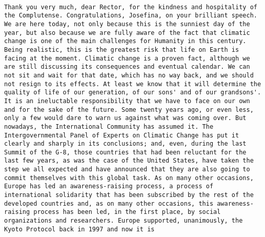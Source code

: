 \documentclass[
]{article}
\begin{document}
\begin{verbatim}
                                                                                                                                                                                                                                                                                                                                                                                                                                                                                                                                                                                                                                                                                                                                                                                                                                                                                                                                                                                                                                                                                                                                                                                                                                                                                                                                                                                                                                                                                                                                                                                           Thank you very much, dear Rector, for the kindness and hospitality of the Complutense. Congratulations, Josefina, on your brilliant speech. We are here today, not only because this is the sunniest day of the year, but also because we are fully aware of the fact that climatic change is one of the main challenges for Humanity in this century. Being realistic, this is the greatest risk that life on Earth is facing at the moment. Climatic change is a proven fact, although we are still discussing its consequences and eventual calendar. We can not sit and wait for that date, which has no way back, and we should not resign to its effects. At least we know that it will determine the quality of life of our generation, of our sons' and of our grandsons'. It is an ineluctable responsibility that we have to face on our own and for the sake of the future. Some twenty years ago, or even less, only a few would dare to warn us against what was coming over. But nowadays, the International Community has assumed it. The Intergovernmental Panel of Experts on Climatic Change has put it clearly and sharply in its conclusions; and, even, during the last Summit of the G-8, those countries that had been reluctant for the last few years, as was the case of the United States, have taken the step we all expected and have announced that they are also going to commit themselves with this global task. As on many other occasions, Europe has led an awareness-raising process, a process of international solidarity that has been subscribed by the rest of the developed countries and, as on many other occasions, this awareness-raising process has been led, in the first place, by social organizations and researchers. Europe supported, unanimously, the Kyoto Protocol back in 1997 and now it is 
\end{verbatim}
\end{document}
